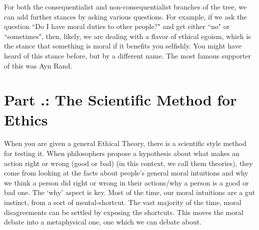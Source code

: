 For both the consequentialist and non-consequentialist branches of the tree, we can add further stances by asking various questions. For example, if we ask the question ``Do I have moral duties to other people?" and get either ``no" or ``sometimes", then, likely, we are dealing with a flavor of ethical egoism, which is the stance that something is moral if it benefits you selfishly. You might have heard of this stance before, but by a different name. The most famous supporter of this was Ayn Rand.

\section{Part \thechapcount.\theseccount: The Scientific Method for Ethics}

When you are given a general Ethical Theory, there is a scientific style method for testing it. When philosophers propose a hypothesis about what makes an action right or wrong (good or bad) (in this context, we call them theories), they come from looking at the facts about people’s general moral intuitions and why we think a person did right or wrong in their actions/why a person is a good or bad one.  The ‘why’ aspect is key. Most of the time, our moral intuitions are a gut instinct, from a sort of mental-shortcut. The vast majority of the time, moral disagreements can be settled by exposing the shortcuts. This moves the moral debate into a metaphysical one, one which we can debate about. 


